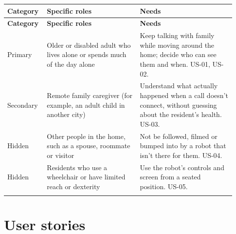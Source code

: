 \documentclass[12pt,letterpaper]{article}
\begin{document}
\begin{longtable}{@{}>{\RaggedRight\arraybackslash}p{0.14\linewidth}>{\RaggedRight\arraybackslash}p{0.39\linewidth}>{\RaggedRight\arraybackslash}p{0.4\linewidth}@{}}

\toprule\textbf{Category} & \textbf{Specific roles} & \textbf{Needs}\\\midrule\endfirsthead

\toprule\textbf{Category} & \textbf{Specific roles} & \textbf{Needs}\\\midrule\endhead

\midrule\endfoot\bottomrule\endlastfoot

Primary & Older or disabled adult who lives alone or spends much of the day alone & Keep talking with family while moving around the home; decide who can see them and when. US-01, US-02. \\ \addlinespace[3pt]

Secondary & Remote family caregiver (for example, an adult child in another city) & Understand what actually happened when a call doesn't connect, without guessing about the resident's health. US-03. \\ \addlinespace[3pt]

Hidden & Other people in the home, such as a spouse, roommate or visitor & Not be followed, filmed or bumped into by a robot that isn't there for them. US-04. \\ \addlinespace[3pt]

Hidden & Residents who use a wheelchair or have limited reach or dexterity & Use the robot's controls and screen from a seated position. US-05. \\ \addlinespace[3pt]

\end{longtable}

\endgroup

\section{User stories}
\end{document}
